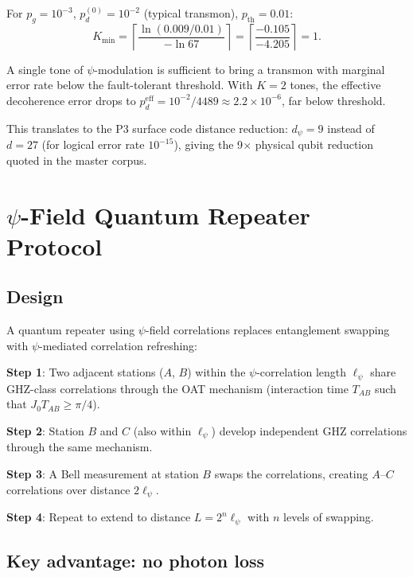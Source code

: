 \documentclass[11pt]{article}
\theoremstyle{definition}
\theoremstyle{remark}
\begin{document}
For $p_g = 10^{-3}$, $p_d^{(0)} = 10^{-2}$ (typical transmon),
$p_{\mathrm{th}} = 0.01$:
\begin{equation}
K_{\min} = \left\lceil \frac{\ln(0.009/0.01)}{-\ln 67} \right\rceil
= \left\lceil \frac{-0.105}{-4.205} \right\rceil = 1.
\end{equation}

A single tone of $\psi$-modulation is sufficient to bring a transmon
with marginal error rate below the fault-tolerant threshold. With $K=2$
tones, the effective decoherence error drops to $p_d^{\mathrm{eff}}
= 10^{-2}/4489 \approx 2.2\times 10^{-6}$, far below threshold.

This translates to the P3 surface code distance reduction:
$d_\psi = 9$ instead of $d = 27$ (for logical error rate $10^{-15}$),
giving the 9$\times$ physical qubit reduction quoted in the master
corpus.

\section{$\psi$-Field Quantum Repeater Protocol}
\label{sec:repeater}

\subsection{Design}

A quantum repeater using $\psi$-field correlations replaces
entanglement swapping with $\psi$-mediated correlation refreshing:

\textbf{Step 1}: Two adjacent stations ($A$, $B$) within the
$\psi$-correlation length $\ell_\psi$ share GHZ-class correlations
through the OAT mechanism (interaction time $T_{AB}$ such that
$J_0 T_{AB} \geq \pi/4$).

\textbf{Step 2}: Station $B$ and $C$ (also within $\ell_\psi$) develop
independent GHZ correlations through the same mechanism.

\textbf{Step 3}: A Bell measurement at station $B$ swaps the
correlations, creating $A$--$C$ correlations over distance $2\ell_\psi$.

\textbf{Step 4}: Repeat to extend to distance $L = 2^n \ell_\psi$
with $n$ levels of swapping.

\subsection{Key advantage: no photon loss}
\end{document}
